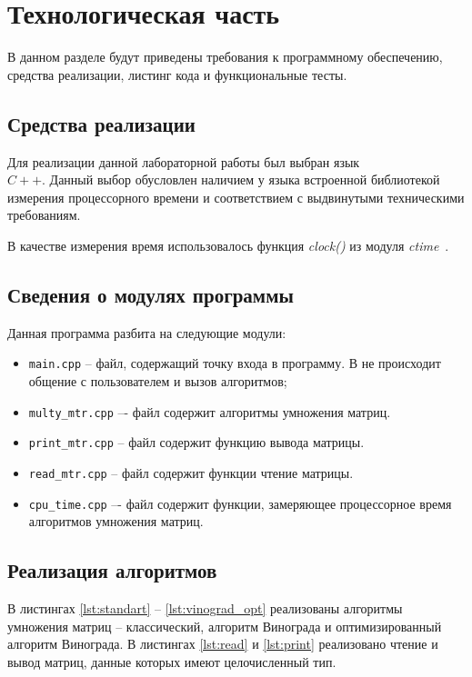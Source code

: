 \chapter{Технологическая часть}

В данном разделе будут приведены требования к программному обеспечению, средства реализации, листинг кода и функциональные тесты.

\section{Средства реализации}

Для реализации данной лабораторной работы был выбран язык \\ $C++$\cite{cpp-lang}. Данный выбор обусловлен  наличием у языка встроенной библиотекой измерения процессорного времени и соответствием с выдвинутыми техническими требованиям.

В качестве измерения время использовалось функция \textit{clock()} из модуля \textit{ctime}~\cite{cpp-lang-time}. 

\clearpage

\section{Сведения о модулях программы}

Данная программа разбита на следующие модули:

\begin{itemize}[label=---]
	\item \texttt{main.cpp} -- файл, содержащий точку входа в программу. В не происходит общение с пользователем и вызов алгоритмов;
	\item \texttt{multy\_mtr.cpp} –- файл содержит алгоритмы умножения матриц.
	\item \texttt{print\_mtr.cpp} -- файл содержит функцию вывода матрицы.
	\item \texttt{read\_mtr.cpp} -- файл содержит функции чтение матрицы.
	\item \texttt{cpu\_time.cpp} –- файл содержит функции, замеряющее процессорное время алгоритмов умножения матриц.
\end{itemize}

\section{Реализация алгоритмов}

В листингах \ref{lst:standart} -- \ref{lst:vinograd_opt} реализованы алгоритмы умножения матриц -- классический, алгоритм Винограда и оптимизированный алгоритм Винограда.
В листингах \ref{lst:read} и \ref{lst:print} реализовано чтение и вывод матриц, данные которых имеют целочисленный тип.


